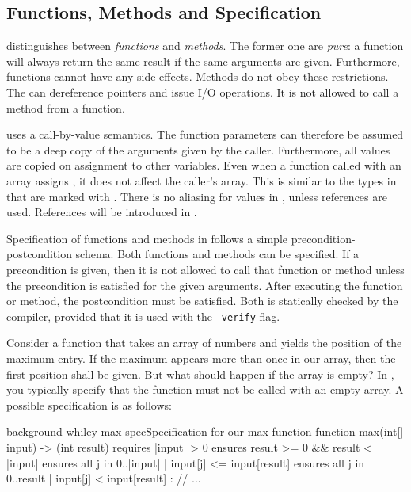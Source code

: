 \subsection{Functions, Methods and Specification}
\whiley distinguishes between \emph{functions} and \emph{methods}.
The former one are \emph{pure}: a function will always return the same result if the same arguments are given.
Furthermore, functions cannot have any side-effects.
Methods do not obey these restrictions.
The can dereference pointers and issue I/O operations.
It is not allowed to call a method from a function.

\whiley uses a call-by-value semantics.
The function parameters can therefore be assumed to be a deep copy of the arguments given by the caller.
Furthermore, all values are copied on assignment to other variables.
Even when a function called with an array  assigns , it does not affect the caller's array.
This is similar to the types in \rust that are marked with .
There is no aliasing for values in \whiley, unless references are used.
References will be introduced in .

Specification of functions and methods in \whiley follows a simple precondition-postcondition schema.
Both functions and methods can be specified.
If a precondition is given, then it is not allowed to call that function or method unless the precondition is satisfied for the given arguments.
After executing the function or method, the postcondition must be satisfied.
Both is statically checked by the compiler, provided that it is used with the \texttt{-verify} flag.

Consider a function that takes an array of numbers and yields the position of the maximum entry.
If the maximum appears more than once in our array, then the first position shall be given.
But what should happen if the array is empty?
In \whiley, you typically specify that the function must not be called with an empty array.
A possible specification is as follows:

\begin{whileycodec}{background-whiley-max-spec}{Specification for our max function}
function max(int[] input) -> (int result)
requires |input| > 0
ensures result >= 0 && result < |input|
ensures all { j in 0..|input| | input[j] <= input[result] }
ensures all { j in 0..result  | input[j] <  input[result] }:
	// ...
\end{whileycodec}

